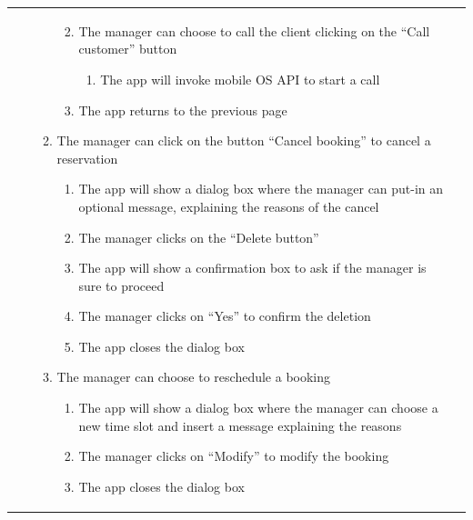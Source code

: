 \documentclass{article}
\begin{document}
\begin{center}
\begin{adjustwidth}{-1.5cm}{}
\begin{tabular}[h!]{|m{7.5em}|m{27.5em}|}
\begin{enumerate}
\begin{enumerate}
\begin{enumerate}
\begin{enumerate}
										\end{enumerate}
									
										\item The manager can choose to call the client clicking on the “Call customer” button
										
										\begin{enumerate}
											
											\item The app will invoke mobile OS API to start a call
											
										\end{enumerate}
									
										\item The app returns to the previous page
										
										
									\end{enumerate}
								
									\item The manager can click on the button “Cancel booking” to cancel a reservation
									
									\begin{enumerate}
										
										\item The app will show a dialog box where the manager can put-in an optional message, explaining the reasons of the cancel
										\item The manager clicks on the “Delete button”
										\item The app will show a confirmation box to ask if the manager is sure to proceed
										\item The manager clicks on “Yes” to confirm the deletion
										\item The app closes the dialog box
										
									\end{enumerate}
								
									\item The manager can choose to reschedule a booking
									
									\begin{enumerate}
										
										\item The app will show a dialog box where the manager can choose a new time slot and insert a message explaining the reasons
										\item The manager clicks on “Modify” to modify the booking
										\item The app closes the dialog box
										

\end{enumerate}
\end{enumerate}
\end{enumerate}
\end{tabular}
\end{adjustwidth}
\end{center}
\end{document}
